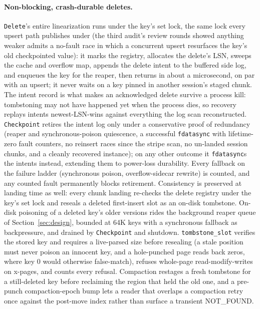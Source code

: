 \documentclass{article}
\begin{document}
\paragraph{Non-blocking, crash-durable deletes.}
\texttt{Delete}'s entire linearization runs under the key's set lock, the same lock every upsert path publishes under (the third audit's review rounds showed anything weaker admits a no-fault race in which a concurrent upsert resurfaces the key's old checkpointed value): it marks the registry, allocates the delete's LSN, sweeps the cache and overflow map, appends the delete intent to the buffered side log, and enqueues the key for the reaper, then returns in about a microsecond, on par with an upsert; it never waits on a key pinned in another session's staged chunk. The intent record is what makes an acknowledged delete survive a process kill: tombstoning may not have happened yet when the process dies, so recovery replays intents newest-LSN-wins against everything the log scan reconstructed. \texttt{Checkpoint} retires the intent log only under a conservative proof of redundancy (reaper and synchronous-poison quiescence, a successful \texttt{fdatasync} with lifetime-zero fault counters, no reinsert races since the stripe scan, no un-landed session chunks, and a cleanly recovered instance); on any other outcome it \texttt{fdatasync}s the intents instead, extending them to power-loss durability. Every fallback on the failure ladder (synchronous poison, overflow-sidecar rewrite) is counted, and any counted fault permanently blocks retirement. Consistency is preserved at landing time as well: every chunk landing re-checks the delete registry under the key's set lock and reseals a deleted first-insert slot as an on-disk tombstone. On-disk poisoning of a deleted key's older versions rides the background reaper queue of Section~\ref{sec:design}, bounded at 64K keys with a synchronous fallback as backpressure, and drained by \texttt{Checkpoint} and shutdown. \texttt{tombstone\_slot} verifies the stored key and requires a live-parsed size before resealing (a stale position must never poison an innocent key, and a hole-punched page reads back zeros, where key 0 would otherwise false-match), refuses whole-page read-modify-writes on x-pages, and counts every refusal. Compaction restages a fresh tombstone for a still-deleted key before reclaiming the region that held the old one, and a pre-punch compaction-epoch bump lets a reader that overlaps a compaction retry once against the post-move index rather than surface a transient NOT\_FOUND.
\end{document}
